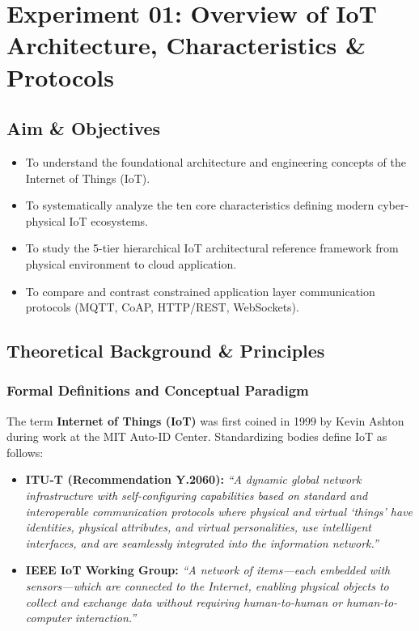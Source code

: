 \documentclass[11pt,a4paper]{article}
\begin{document}
\newpage

\section{Experiment 01: Overview of IoT Architecture, Characteristics \& Protocols}

\subsection{Aim \& Objectives}
\begin{itemize}[noitemsep]
    \item To understand the foundational architecture and engineering concepts of the Internet of Things (IoT).
    \item To systematically analyze the ten core characteristics defining modern cyber-physical IoT ecosystems.
    \item To study the 5-tier hierarchical IoT architectural reference framework from physical environment to cloud application.
    \item To compare and contrast constrained application layer communication protocols (MQTT, CoAP, HTTP/REST, WebSockets).
\end{itemize}

\subsection{Theoretical Background \& Principles}

\subsubsection{Formal Definitions and Conceptual Paradigm}
The term \textbf{Internet of Things (IoT)} was first coined in 1999 by Kevin Ashton during work at the MIT Auto-ID Center. Standardizing bodies define IoT as follows:
\begin{itemize}[noitemsep]
    \item \textbf{ITU-T (Recommendation Y.2060):} \textit{``A dynamic global network infrastructure with self-configuring capabilities based on standard and interoperable communication protocols where physical and virtual `things' have identities, physical attributes, and virtual personalities, use intelligent interfaces, and are seamlessly integrated into the information network.''}
    \item \textbf{IEEE IoT Working Group:} \textit{``A network of items—each embedded with sensors—which are connected to the Internet, enabling physical objects to collect and exchange data without requiring human-to-human or human-to-computer interaction.''}
\end{itemize}
\end{document}
